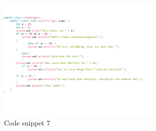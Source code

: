 \begin{figure}[H]
    \centering
    \includegraphics[width=0.7\textwidth]{figures/bier.png}
    \caption{Code snippet 7}
    \label{fig:appendix-example}
\end{figure}





